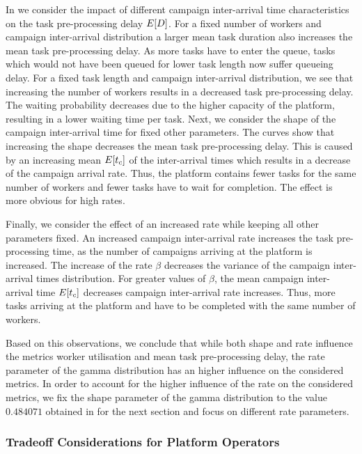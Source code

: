 In  we consider the impact of different campaign inter-arrival time characteristics on the task pre-processing delay \(E[D]\).
For a fixed number of workers and campaign inter-arrival distribution a larger mean task duration also increases the mean task pre-processing delay. 
As more tasks have to enter the queue, tasks which would not have been queued for lower task length now suffer queueing delay.
For a fixed task length and campaign inter-arrival distribution, we see that increasing the number of workers results in a decreased task pre-processing delay.
The waiting probability decreases due to the higher capacity of the platform, resulting in a lower waiting time per task.
Next, we consider the shape of the campaign inter-arrival time for fixed other parameters. 
The curves show that increasing the shape decreases the mean task pre-processing delay. 
This is caused by an increasing mean \(E[t_c]\) of the inter-arrival times which results in a decrease of the campaign arrival rate.
Thus, the platform contains fewer tasks for the same number of workers and fewer tasks have to wait for completion.
The effect is more obvious for high rates.

Finally, we consider the effect of an increased rate while keeping all other parameters fixed.
An increased campaign inter-arrival rate increases the task pre-processing time, as the number of campaigns arriving at the platform is increased.
The increase of the rate \(\beta\) decreases the variance of the campaign inter-arrival times distribution.
For greater values of \(\beta\), the mean campaign inter-arrival time \(E[t_c]\) decreases campaign inter-arrival rate increases. 
Thus, more tasks arriving at the platform and have to be completed with the same number of workers.

Based on this observations, we conclude that while both shape and rate influence the metrics worker utilisation and mean task pre-processing delay, the rate parameter of the gamma distribution has an higher influence on the considered metrics.
In order to account for the higher influence of the rate on the considered metrics, we fix the shape parameter of the gamma distribution to the value \(0.484071\) obtained in  for the next section and focus on different rate parameters.

\subsubsection*{Tradeoff Considerations for Platform Operators}

